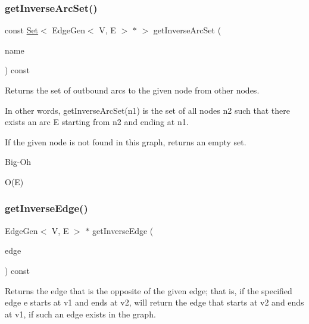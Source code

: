 \subsubsection{\texorpdfstring{get\+Inverse\+Arc\+Set()}{getInverseArcSet()}\hspace{0.1cm}{\footnotesize\ttfamily [2/2]}}
{\footnotesize\ttfamily const \mbox{\hyperlink{classstanfordcpplib_1_1collections_1_1GenericSet}{Set}}$<$ Edge\+Gen$<$ V, E $>$  $\ast$ $>$ get\+Inverse\+Arc\+Set (\begin{DoxyParamCaption}\item[{const std\+::string \&}]{name }\end{DoxyParamCaption}) const\hspace{0.3cm}{\ttfamily [inherited]}}



Returns the set of outbound arcs to the given node from other nodes. 

In other words, get\+Inverse\+Arc\+Set(n1) is the set of all nodes n2 such that there exists an arc E starting from n2 and ending at n1.

If the given node is not found in this graph, returns an empty set. \begin{DoxyRefDesc}{Big-\/\+Oh}
\item[\mbox{\hyperlink{BigOh__BigOh000066}{Big-\/\+Oh}}]O(\+E) \end{DoxyRefDesc}
\mbox{\label{classBasicGraphGen_ae81616e12d12f2dcfa295b4a3b48f960}} 
\subsubsection{\texorpdfstring{get\+Inverse\+Edge()}{getInverseEdge()}}
{\footnotesize\ttfamily Edge\+Gen$<$ V, E $>$ $\ast$ get\+Inverse\+Edge (\begin{DoxyParamCaption}\item[{Edge\+Gen$<$ V, E $>$ $\ast$}]{edge }\end{DoxyParamCaption}) const}



Returns the edge that is the opposite of the given edge; that is, if the specified edge e starts at v1 and ends at v2, will return the edge that starts at v2 and ends at v1, if such an edge exists in the graph. 

